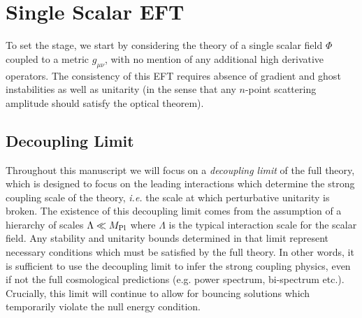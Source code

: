 \documentclass[12pt]{article}
\def\mpl{M_{\rm Pl}}
\def\ie{{\it i.e. }}
\def\mn{_{\mu \nu}}
\begin{document}
\section{Single Scalar EFT}
\label{sec:eft}


To set the stage, we start by considering the theory of a single scalar field $\Phi$  coupled to a metric $g\mn$, with no mention of any additional high derivative operators. The consistency of this EFT requires absence of gradient and ghost instabilities as well as unitarity (in the sense that any $n$-point scattering amplitude should satisfy the optical theorem).


\subsection{Decoupling Limit}
\label{sec:dL}
Throughout this manuscript we will focus on a {\it decoupling limit} of the full theory, which is designed to focus on the leading interactions which determine the strong coupling scale of the theory, \ie the scale at which perturbative unitarity is broken. The existence of this decoupling limit comes from the assumption of a hierarchy of scales $\Lambda \ll \mpl$ where $\Lambda$ is the typical interaction scale for the scalar field. Any stability and unitarity bounds determined in that limit represent necessary conditions which must be satisfied by the full theory. In other words, it is sufficient to use the decoupling limit to infer the strong coupling physics, even if not the full cosmological predictions (e.g. power spectrum, bi-spectrum etc.).  Crucially, this limit will continue to allow for bouncing solutions which temporarily violate the null energy condition.
\\
\end{document}

